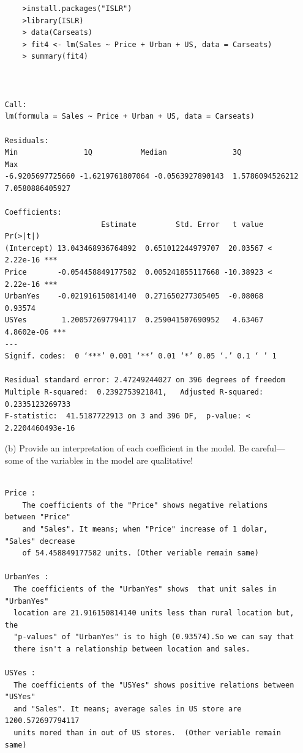 \documentclass{article}
\begin{document}
\begin{itemize}
\begin{program}
	\begin{verbatim}
	>install.packages("ISLR")
	>library(ISLR)
	> data(Carseats)
	> fit4 <- lm(Sales ~ Price + Urban + US, data = Carseats)
	> summary(fit4)



Call:
lm(formula = Sales ~ Price + Urban + US, data = Carseats)

Residuals:
Min               1Q           Median               3Q              Max 
-6.9205697725660 -1.6219761807064 -0.0563927890143  1.5786094526212  7.0580886405927 

Coefficients:
                      Estimate         Std. Error   t value   Pr(>|t|)    
(Intercept) 13.043468936764892  0.651012244979707  20.03567 < 2.22e-16 ***
Price       -0.054458849177582  0.005241855117668 -10.38923 < 2.22e-16 ***
UrbanYes    -0.021916150814140  0.271650277305405  -0.08068    0.93574    
USYes        1.200572697794117  0.259041507690952   4.63467 4.8602e-06 ***
---
Signif. codes:  0 ‘***’ 0.001 ‘**’ 0.01 ‘*’ 0.05 ‘.’ 0.1 ‘ ’ 1

Residual standard error: 2.47249244027 on 396 degrees of freedom
Multiple R-squared:  0.2392753921841,	Adjusted R-squared:  0.2335123269733 
F-statistic:  41.5187722913 on 3 and 396 DF,  p-value: < 2.2204460493e-16

	\end{verbatim}
\end{program}


\item[(b)] Provide an interpretation of each coefficient in the model. Be careful—some of the variables in the model are qualitative!

\begin{lstlisting}

Price :
    The coefficients of the "Price" shows negative relations between "Price" 
    and "Sales". It means; when "Price" increase of 1 dolar,  "Sales" decrease 
    of 54.458849177582 units. (Other veriable remain same)

UrbanYes :
  The coefficients of the "UrbanYes" shows  that unit sales in  "UrbanYes" 
  location are 21.916150814140 units less than rural location but, the 
  "p-values" of "UrbanYes" is to high (0.93574).So we can say that 
  there isn't a relationship between location and sales. 

USYes :
  The coefficients of the "USYes" shows positive relations between "USYes" 
  and "Sales". It means; average sales in US store are 1200.572697794117 
  units mored than in out of US stores.  (Other veriable remain same)
  

\end{lstlisting}
\end{itemize}
\end{document}
